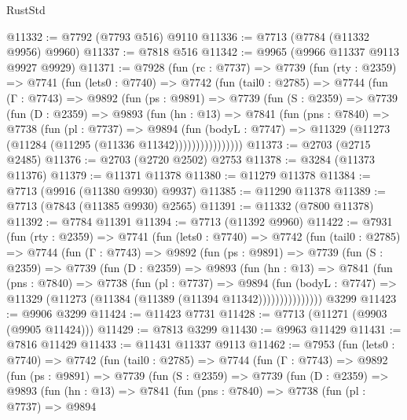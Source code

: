 \begin{lexlean}{RustStd}
\begin{coremodule}
@11332 := @7792 (@7793 @516) @9110
@11336 := @7713 (@7784 (@11332 @9956) @9960)
@11337 := @7818 @516
@11342 := @9965 (@9966 @11337 @9113 @9927 @9929)
@11371 := @7928
    (fun (rc : @7737) =>
    @7739
      (fun (rty : @2359) =>
      @7741
        (fun (lets0 : @7740) =>
        @7742
          (fun (tail0 : @2785) =>
          @7744
            (fun (Γ : @7743) =>
            @9892
              (fun (ps : @9891) =>
              @7739
                (fun (S : @2359) =>
                @7739
                  (fun (D : @2359) =>
                  @9893
                    (fun (hn : @13) =>
                    @7841
                      (fun (pns : @7840) =>
                      @7738
                        (fun (pl : @7737) =>
                        @9894
                          (fun (bodyL : @7747) =>
                          @11329 (@11273 (@11284 (@11295 (@11336 @11342))))))))))))))))
@11373 := @2703 (@2715 @2485)
@11376 := @2703 (@2720 @2502) @2753
@11378 := @3284 (@11373 @11376)
@11379 := @11371 @11378
@11380 := @11279 @11378
@11384 := @7713 (@9916 (@11380 @9930) @9937)
@11385 := @11290 @11378
@11389 := @7713 (@7843 (@11385 @9930) @2565)
@11391 := @11332 (@7800 @11378)
@11392 := @7784 @11391
@11394 := @7713 (@11392 @9960)
@11422 := @7931
    (fun (rty : @2359) =>
    @7741
      (fun (lets0 : @7740) =>
      @7742
        (fun (tail0 : @2785) =>
        @7744
          (fun (Γ : @7743) =>
          @9892
            (fun (ps : @9891) =>
            @7739
              (fun (S : @2359) =>
              @7739
                (fun (D : @2359) =>
                @9893
                  (fun (hn : @13) =>
                  @7841
                    (fun (pns : @7840) =>
                    @7738
                      (fun (pl : @7737) =>
                      @9894
                        (fun (bodyL : @7747) =>
                        @11329 (@11273 (@11384 (@11389 (@11394 @11342)))))))))))))))
    @3299
@11423 := @9906 @3299
@11424 := @11423 @7731
@11428 := @7713 (@11271 (@9903 (@9905 @11424)))
@11429 := @7813 @3299
@11430 := @9963 @11429
@11431 := @7816 @11429
@11433 := @11431 @11337 @9113
@11462 := @7953
    (fun (lets0 : @7740) =>
    @7742
      (fun (tail0 : @2785) =>
      @7744
        (fun (Γ : @7743) =>
        @9892
          (fun (ps : @9891) =>
          @7739
            (fun (S : @2359) =>
            @7739
              (fun (D : @2359) =>
              @9893
                (fun (hn : @13) =>
                @7841
                  (fun (pns : @7840) =>
                  @7738
                    (fun (pl : @7737) =>
                    @9894

\end{coremodule}
\end{lexlean}
